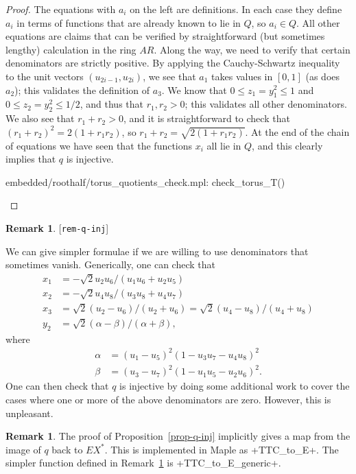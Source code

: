 \documentclass[reqno]{amsart}
\newcommand{\lbl}[1]{\label{#1}\textup{[\texttt{#1}]}\par}
\newcommand{\lbl}{\label}
\newcommand{\al}        {\alpha}
\newcommand{\bt}        {\beta}
\newcommand{\rt}        {\sqrt{2}}
\renewcommand{\:}{\colon}
\theoremstyle{definition}
\newtheorem{remark}[theorem]{Remark}
\begin{document}
\begin{proof}
 The equations with $a_i$ on the left are definitions.  In each case
 they define $a_i$ in terms of functions that are already known to lie
 in $Q$, so $a_i\in Q$.  All other equations are claims that can be
 verified by straightforward (but sometimes lengthy) calculation in
 the ring $AR$.  Along the way, we need to verify that certain
 denominators are strictly positive.  By applying the Cauchy-Schwartz
 inequality to the unit vectors $(u_{2i-1},u_{2i})$, we see that $a_1$
 takes values in $[0,1]$ (as does $a_2$); this validates the
 definition of $a_3$.  We know that $0\leq z_1=y_1^2\leq 1$ and
 $0\leq z_2=y_2^2\leq 1/2$, and thus that $r_1,r_2>0$; this validates
 all other denominators.  We also see that $r_1+r_2>0$, and it is
 straightforward to check that $(r_1+r_2)^2=2(1+r_1r_2)$, so
 $r_1+r_2=\sqrt{2(1+r_1r_2)}$.  At the end of the chain of equations we
 have seen that the functions $x_i$ all lie in $Q$, and this clearly
 implies that $q$ is injective.
 \begin{checks}
  embedded/roothalf/torus_quotients_check.mpl: check_torus_T()
 \end{checks}
\end{proof}

\begin{remark}\lbl{rem-q-inj}
 We can give simpler formulae if we are willing to use denominators
 that sometimes vanish.  Generically, one can check that
 \begin{align*}
  x_1 &= -\rt u_2u_6/(u_1u_6+u_2u_5) \\
  x_2 &= -\rt u_4u_8/(u_3u_8+u_4u_7) \\
  x_3 &= \rt(u_2-u_6)/(u_2+u_6) = \rt(u_4-u_8)/(u_4+u_8) \\
  y_2 &= \rt(\al-\bt)/(\al+\bt),
 \end{align*}
 where
 \begin{align*}
  \al &= (u_1-u_5)^2(1-u_3u_7-u_4u_8)^2 \\
  \bt &= (u_3-u_7)^2(1-u_1u_5-u_2u_6)^2.
 \end{align*}
 One can then check that $q$ is injective by doing some additional
 work to cover the cases where one or more of the above denominators
 are zero.  However, this is unpleasant.
\end{remark}
\begin{remark}
 The proof of Proposition~\ref{prop-q-inj} implicitly gives a map from
 the image of $q$ back to $EX^*$.  This is implemented in Maple as
 \mcode+TTC_to_E+.  The simpler function defined in
 Remark~\ref{rem-q-inj} is \mcode+TTC_to_E_generic+.
\end{remark}
\end{document}
